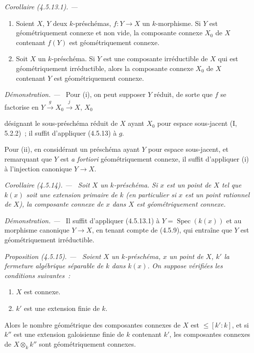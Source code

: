 \documentclass[10pt,oneside]{book}
\newcommand{\oldpage}[2][]{%
  \setcounter{footnote}{0}%
  \marginpar{\scriptsize\textbf{#1}~|~#2}\ignorespaces}
\newenvironment{proposition}[1][]{%
  \par\medskip\noindent\itshape Proposition (#1). ---\ }{\par}
\newenvironment{corollary}[1][]{%
  \par\medskip\noindent\itshape Corollaire (#1). ---\ }{\par}
\newenvironment{proof}{%
  \par\medskip\noindent\textit{Démonstration. ---\ }}{\par}
\begin{document}
\begin{corollary}[4.5.13.1]
\label{IV.2.4.5.13.1-fr}
\begin{enumerate}
\item[(i)] Soient $X$, $Y$ deux $k$-préschémas, $f:Y\to X$ un $k$-morphisme.
Si $Y$ est géométriquement connexe et non vide, la composante connexe $X_0$ de
$X$ contenant $f(Y)$ est géométriquement connexe.
\item[(ii)] Soit $X$ un $k$-préschéma. Si $Y$ est une composante irréductible
de $X$ qui est géométriquement irréductible, alors la composante connexe $X_0$
de $X$ contenant $Y$ est géométriquement connexe.
\end{enumerate}
\end{corollary}

\begin{proof}
Pour (i), on peut supposer $Y$ réduit, de sorte que $f$ se factorise en
$Y\xrightarrow{g}X_0\xrightarrow{j}X$, $X_0$

\oldpage[IV-2]{65}

désignant le sous-préschéma réduit de $X$ ayant $X_0$ pour espace sous-jacent
(I, 5.2.2)~; il suffit d'appliquer (4.5.13) à $g$.

Pour (ii), en considérant un préschéma ayant $Y$ pour espace sous-jacent, et
remarquant que $Y$ est \emph{a fortiori} géométriquement connexe, il suffit
d'appliquer (i) à l'injection canonique $Y\to X$.
\end{proof}

\begin{corollary}[4.5.14]
\label{IV.2.4.5.14-fr}
Soit $X$ un $k$-préschéma. Si $x$ est un point de $X$ tel que $k(x)$ soit une
extension primaire de $k$ (en particulier si $x$ est un point rationnel de
$X$), la composante connexe de $x$ dans $X$ est géométriquement connexe.
\end{corollary}

\begin{proof}
Il suffit d'appliquer (4.5.13.1) à $Y=\operatorname{Spec}(k(x))$ et au
morphisme canonique $Y\to X$, en tenant compte de (4.5.9), qui entraîne que
$Y$ est géométriquement irréductible.
\end{proof}

\begin{proposition}[4.5.15]
\label{IV.2.4.5.15-fr}
Soient $X$ un $k$-préschéma, $x$ un point de $X$, $k'$ la fermeture algébrique
séparable de $k$ dans $k(x)$. On suppose vérifiées les conditions suivantes~:
\begin{enumerate}
\item[(i)] $X$ est connexe.
\item[(ii)] $k'$ est une extension finie de $k$.
\end{enumerate}
Alors le nombre géométrique des composantes connexes de $X$ est
$\leqslant[k':k]$, et si $k''$ est une extension galoisienne finie de $k$
contenant $k'$, les composantes connexes de $X\otimes_k k''$ sont
géométriquement connexes.
\end{proposition}
\end{document}
